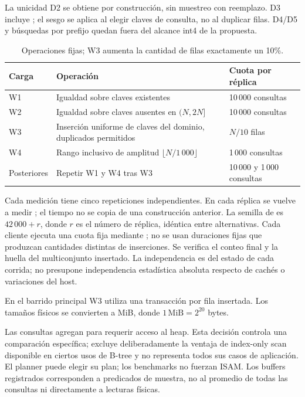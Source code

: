 \documentclass[11pt,a4paper]{article}
\newcommand{\code}[1]{\texttt{\detokenize{#1}}}
\begin{document}
La unicidad D2 se obtiene por construcción, sin muestreo con reemplazo. D3 incluye
\code{d2.sql}; el sesgo se aplica al elegir claves de consulta, no al duplicar
filas. D4/D5 y búsquedas por prefijo quedan fuera del alcance int4 de la propuesta.

\begin{table}[htbp]
\centering\small
\begin{tabular}{P{.12\linewidth}P{.57\linewidth}P{.23\linewidth}}
\toprule
Carga & Operación & Cuota por réplica\\
\midrule
W1 & Igualdad sobre claves existentes & 10\,000 consultas\\
W2 & Igualdad sobre claves ausentes en $(N,2N]$ & 10\,000 consultas\\
W3 & Inserción uniforme de claves del dominio, duplicados permitidos & $N/10$ filas\\
W4 & Rango inclusivo de amplitud $\lfloor N/1\,000\rfloor$ & 1\,000 consultas\\
Posteriores & Repetir W1 y W4 tras W3 & 10\,000 y 1\,000 consultas\\
\bottomrule
\end{tabular}
\caption{Operaciones fijas; W3 aumenta la cantidad de filas exactamente un 10\%.}
\end{table}

Cada medición tiene cinco repeticiones independientes. En cada réplica se vuelve
a medir \code{CREATE INDEX}; el tiempo no se copia de una construcción anterior.
La semilla de \code{pgbench} es $42\,000 + r$, donde $r$ es el número de réplica,
idéntica entre alternativas. Cada cliente ejecuta una cuota fija mediante
\code{-t}; no se usan duraciones fijas que produzcan cantidades distintas de
inserciones. Se verifica el conteo final y la huella del multiconjunto insertado.
La independencia es del estado de cada corrida; no presupone independencia
estadística absoluta respecto de cachés o variaciones del host.

En el barrido principal W3 utiliza una transacción por fila insertada. Los
tamaños físicos se convierten a MiB, donde $1\,\mathrm{MiB}=2^{20}$ bytes.

Las consultas agregan \code{payload} para requerir acceso al heap. Esta decisión
controla una comparación específica; excluye deliberadamente la ventaja de
index-only scan disponible en ciertos usos de B-tree y no representa todos sus
casos de aplicación. El planner puede elegir su plan; los benchmarks no fuerzan
ISAM. Los buffers registrados corresponden a predicados de muestra, no al
promedio de todas las consultas ni directamente a lecturas físicas.
\end{document}
